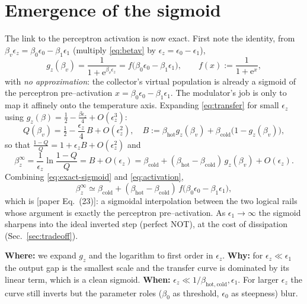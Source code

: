 \documentclass[11pt,a4paper]{article}
\newcommand{\ee}{\mathrm{e}}
\newcommand{\gz}{g_z}
\theoremstyle{definition}
\theoremstyle{remark}
\begin{document}
\section{Emergence of the sigmoid}
\label{sec:sigmoid}
The link to the perceptron activation is now exact. First note the
identity, from $\beta_v\epsilon_z=\beta_0\epsilon_0-\beta_1\epsilon_1$
(multiply \eqref{eq:betav} by $\epsilon_z=\epsilon_0-\epsilon_1$),
\begin{equation}
\gz(\beta_v)=\frac{1}{1+\ee^{\beta_v\epsilon_z}}
= f\big(\beta_0\epsilon_0-\beta_1\epsilon_1\big),\qquad
f(x):=\frac{1}{1+\ee^{x}},
\label{eq:exact-sigmoid}
\end{equation}
with \emph{no approximation}: the collector's virtual population is
already a sigmoid of the perceptron pre--activation
$x=\beta_0\epsilon_0-\beta_1\epsilon_1$. The modulator's job is only to
map it affinely onto the temperature axis. Expanding \eqref{eq:transfer}
for small $\epsilon_z$ using
$\gz(\beta)=\tfrac12-\tfrac{\beta\epsilon_z}{4}+O(\epsilon_z^3)$:
\begin{equation}
Q(\beta_v)=\tfrac12-\frac{\epsilon_z}{4}\,B+O(\epsilon_z^2),\quad
B:=\beta_{\mathrm{hot}}\gz(\beta_v)
+\beta_{\mathrm{cold}}\big(1-\gz(\beta_v)\big),
\end{equation}
so that $\frac{1-Q}{Q}=1+\epsilon_z B+O(\epsilon_z^2)$ and
\begin{equation}
\beta_z^\infty=\frac1{\epsilon_z}\ln\frac{1-Q}{Q}
= B+O(\epsilon_z)
= \beta_{\mathrm{cold}}
+(\beta_{\mathrm{hot}}-\beta_{\mathrm{cold}})\,\gz(\beta_v)+O(\epsilon_z).
\label{eq:activation}
\end{equation}
Combining \eqref{eq:exact-sigmoid} and \eqref{eq:activation},
\begin{equation}
\boxed{\;
\beta_z^\infty \simeq \beta_{\mathrm{cold}}
+(\beta_{\mathrm{hot}}-\beta_{\mathrm{cold}})\,
f\big(\beta_0\epsilon_0-\beta_1\epsilon_1\big),
\;}
\label{eq:sigmoid-final}
\end{equation}
which is [paper Eq.~(23)]: a sigmoidal interpolation between the two
logical rails whose argument is exactly the perceptron pre--activation.
As $\epsilon_1\to\infty$ the sigmoid sharpens into the ideal inverted
step (perfect NOT), at the cost of dissipation (Sec.~\ref{sec:tradeoff}).

\begin{approxbox}
\textbf{Where:} we expand $\gz$ and the logarithm to first order in
$\epsilon_z$. \textbf{Why:} for $\epsilon_z\ll\epsilon_1$ the output gap
is the smallest scale and the transfer curve is dominated by its linear
term, which is a clean sigmoid. \textbf{When:} $\epsilon_z\ll
1/\beta_{\mathrm{hot,cold}},\epsilon_1$. For larger $\epsilon_z$ the
curve still inverts but the parameter roles ($\beta_0$ as threshold,
$\epsilon_0$ as steepness) blur.
\end{approxbox}
\end{document}
